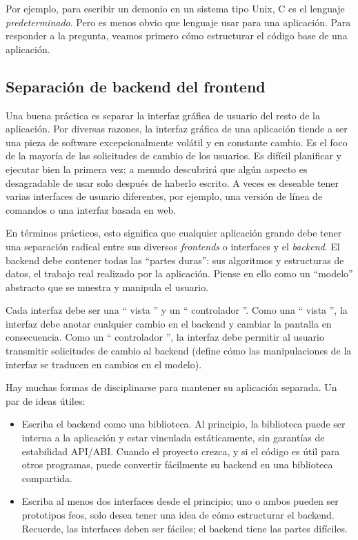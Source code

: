 Por ejemplo, para escribir un demonio en un sistema tipo Unix, C es el lenguaje \emph{predeterminado}. Pero es menos obvio que lenguaje usar para una aplicación. Para responder a la pregunta, veamos primero cómo estructurar el código base de una aplicación.

\subsection{Separación de backend del frontend}
\label{intro-backend-frontend-separation}
Una buena práctica es separar la interfaz gráfica de usuario del resto de la aplicación. Por diversas razones, la interfaz gráfica de una aplicación tiende a ser una pieza de software excepcionalmente volátil y en constante cambio. Es el foco de la mayoría de las solicitudes de cambio de los usuarios. Es difícil planificar y ejecutar bien la primera vez; a menudo descubrirá que algún aspecto es desagradable de usar solo después de haberlo escrito. A veces es deseable tener varias interfaces de usuario diferentes, por ejemplo, una versión de línea de comandos o una interfaz basada en web.

En términos prácticos, esto significa que cualquier aplicación grande debe tener una separación radical entre sus diversos \emph{frontends} o interfaces y el \emph{backend}. El backend debe contener todas las ``partes duras'': sus algoritmos y estructuras de datos, el trabajo real realizado por la aplicación. Piense en ello como un ``modelo'' abstracto que se muestra y manipula el usuario.

Cada interfaz debe ser una `` vista '' y un `` controlador ''. Como una `` vista '', la interfaz debe anotar cualquier cambio en el backend y cambiar la pantalla en consecuencia. Como un `` controlador '', la interfaz debe permitir al usuario transmitir solicitudes de cambio al backend (define cómo las manipulaciones de la interfaz se traducen en cambios en el modelo).

Hay muchas formas de disciplinarse para mantener su aplicación separada. Un par de ideas útiles:

\begin{itemize}
    \item Escriba el backend como una biblioteca. Al principio, la biblioteca puede ser interna a la aplicación y estar vinculada estáticamente, sin garantías de estabilidad API/ABI. Cuando el proyecto crezca, y si el código es útil para otros programas, puede convertir fácilmente su backend en una biblioteca compartida.
    \item Escriba al menos dos interfaces desde el principio; uno o ambos pueden ser prototipos feos, solo desea tener una idea de cómo estructurar el backend. Recuerde, las interfaces deben ser fáciles; el backend tiene las partes difíciles.
\end{itemize}

